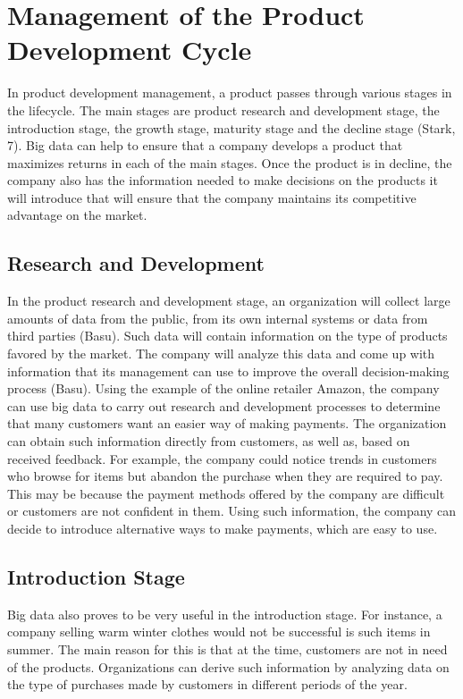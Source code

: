 \documentclass[sigconf]{acmart}
\begin{document}
\section{Management of the Product Development Cycle}
In product development management, a product passes through various stages in the lifecycle. The main stages are product research and development stage, the introduction stage, the growth stage, maturity stage and the decline stage (Stark, 7). Big data can help to ensure that a company develops a product that maximizes returns in each of the main stages. Once the product is in decline, the company also has the information needed to make decisions on the products it will introduce that will ensure that the company maintains its competitive advantage on the market. 
\subsection{Research and Development}
In the product research and development stage, an organization will collect large amounts of data from the public, from its own internal systems or data from third parties (Basu). Such data will contain information on the type of products favored by the market. The company will analyze this data and come up with information that its management can use to improve the overall decision-making process (Basu). 
Using the example of the online retailer Amazon, the company can use big data to carry out research and development processes to determine that many customers want an easier way of making payments. The organization can obtain such information directly from customers, as well as, based on received feedback. For example, the company could notice trends in customers who browse for items but abandon the purchase when they are required to pay. This may be because the payment methods offered by the company are difficult or customers are not confident in them. Using such information, the company can decide to introduce alternative ways to make payments, which are easy to use.
\subsection{Introduction Stage}
Big data also proves to be very useful in the introduction stage. For instance, a company selling warm winter clothes would not be successful is such items in summer. The main reason for this is that at the time, customers are not in need of the products. Organizations can derive such information by analyzing data on the type of purchases made by customers in different periods of the year.
\end{document}
